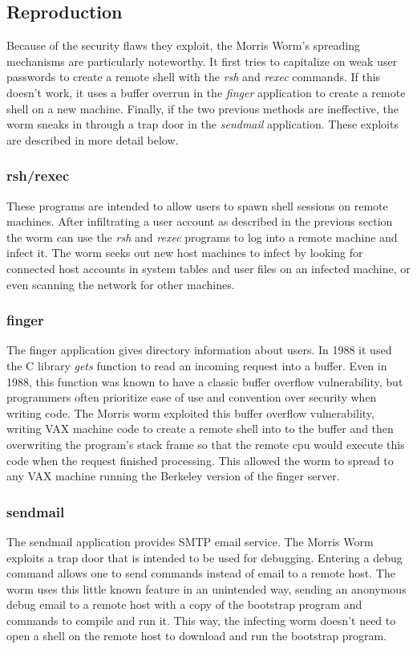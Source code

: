 \subsection*{Reproduction}
Because of the security flaws they exploit, the Morris Worm's spreading
mechanisms are particularly noteworthy. It first tries to capitalize on weak
user passwords to create a remote shell with the \textit{rsh} and \textit{rexec}
commands.
If this doesn't work, it uses a buffer overrun in the \textit{finger}
application to create a remote shell on a new machine. Finally, if the two
previous methods are ineffective, the worm sneaks in through a trap door in the
\textit{sendmail} application. These exploits are described in more detail
below.
\subsubsection*{rsh/rexec}
These programs are intended to allow users to spawn shell sessions on remote
machines. After infiltrating a user account as described in the previous
section the worm can use the \textit{rsh} and \textit{rexec} programs to log
into a remote machine and infect it. The worm seeks out new host machines to
infect by looking for connected host accounts in
system tables and user files on an infected machine, or even scanning the
network for other machines.

\subsubsection*{finger}
The finger application gives directory information about users. In 1988 it used
the C library \textit{gets} function to read an incoming request into a buffer.
Even in 1988, this function was known to have a classic buffer overflow
vulnerability, but programmers often prioritize ease of use and convention over security when
writing code. The Morris worm exploited this buffer overflow vulnerability,
writing VAX machine code to create a remote shell into to the buffer and then
overwriting the program's stack frame so that the remote cpu would execute
this code when the request finished processing. This allowed the worm to spread
to any VAX machine running the Berkeley version of the finger server.

\subsubsection*{sendmail}
The sendmail application provides SMTP email service. The Morris Worm exploits
a trap door that is intended to be used for debugging. Entering a debug command
allows one to send commands instead of email to a remote host. The worm uses
this little known feature in an unintended way, sending an anonymous debug email
to a remote host with a copy of the bootstrap program and commands to compile and run
it. This way, the infecting worm doesn't need to open a shell on the remote host
to download and run the bootstrap program.




